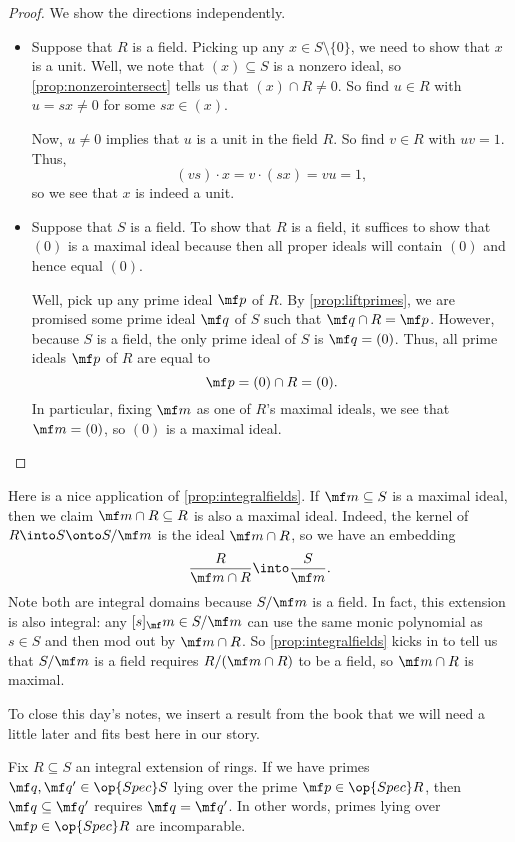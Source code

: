 \begin{proof}
	We show the directions independently.
	\begin{itemize}
		\item Suppose that $R$ is a field. Picking up any $x\in S\setminus\{0\}$, we need to show that $x$ is a unit. Well, we note that $(x)\subseteq S$ is a nonzero ideal, so \autoref{prop:nonzerointersect} tells us that $(x)\cap R\ne0$. So find $u\in R$ with $u=sx\ne0$ for some $sx\in(x)$.

		Now, $u\ne0$ implies that $u$ is a unit in the field $R$. So find $v\in R$ with $uv=1$. Thus,
		\[(vs)\cdot x=v\cdot(sx)=vu=1,\]
		so we see that $x$ is indeed a unit.

		\item Suppose that $S$ is a field. To show that $R$ is a field, it suffices to show that $(0)$ is a maximal ideal because then all proper ideals will contain $(0)$ and hence equal $(0)$.
		
		Well, pick up any prime ideal $\mf p$ of $R$. By \autoref{prop:liftprimes}, we are promised some prime ideal $\mf q$ of $S$ such that $\mf q\cap R=\mf p$. However, because $S$ is a field, the only prime ideal of $S$ is $\mf q=(0)$. Thus, all prime ideals $\mf p$ of $R$ are equal to
		\[\mf p=(0)\cap R=(0).\]
		In particular, fixing $\mf m$ as one of $R$'s maximal ideals, we see that $\mf m=(0)$, so $(0)$ is a maximal ideal.
		\qedhere
	\end{itemize}
\end{proof}
\begin{remark}[Nir] \label{rem:goingdownmax}
	Here is a nice application of \autoref{prop:integralfields}. If $\mf m\subseteq S$ is a maximal ideal, then we claim $\mf m\cap R\subseteq R$ is also a maximal ideal. Indeed, the kernel of $R\into S\onto S/\mf m$ is the ideal $\mf m\cap R$, so we have an embedding
	\[\frac R{\mf m\cap R}\into\frac S{\mf m}.\]
	Note both are integral domains because $S/\mf m$ is a field. In fact, this extension is also integral: any $[s]_\mf m\in S/\mf m$ can use the same monic polynomial as $s\in S$ and then mod out by $\mf m\cap R$. So \autoref{prop:integralfields} kicks in to tell us that $S/\mf m$ is a field requires $R/(\mf m\cap R)$ to be a field, so $\mf m\cap R$ is maximal.
\end{remark}
To close this day's notes, we insert a result from the book that we will need a little later and fits best here in our story.
\begin{lemma}[Incomparability] \label{lem:incomparability}
	Fix $R\subseteq S$ an integral extension of rings. If we have primes $\mf q,\mf q'\in\op{Spec}S$ lying over the prime $\mf p\in\op{Spec}R$, then $\mf q\subseteq\mf q'$ requires $\mf q=\mf q'$. In other words, primes lying over $\mf p\in\op{Spec}R$ are incomparable.
\end{lemma}
